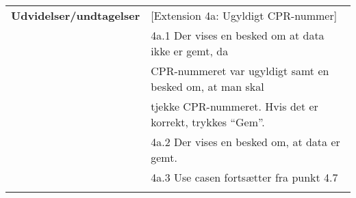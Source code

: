 \begin{table}[h!]
\begin{tabular}{l|l}
		\hline
		\rowcolor[HTML]{A9D9F9} 
		\textbf{Udvidelser/undtagelser} & {[}Extension 4a: Ugyldigt CPR-nummer{]} \\
		\rowcolor[HTML]{A9D9F9} 
		& 4a.1 Der vises en besked om at data ikke er gemt, da \\
		\rowcolor[HTML]{A9D9F9} 
		& CPR-nummeret var ugyldigt samt en besked om, at man skal \\
		\rowcolor[HTML]{A9D9F9} 
		& tjekke CPR-nummeret. Hvis det er korrekt, trykkes “Gem”. \\
		\rowcolor[HTML]{A9D9F9} 
		& 4a.2 Der vises en besked om, at data er gemt. \\
		\rowcolor[HTML]{A9D9F9} 
		& 4a.3 Use casen fortsætter fra punkt 4.7 \\
		\rowcolor[HTML]{A9D9F9} 
		&  \\
	\end{tabular}
\end{table}
\clearpage